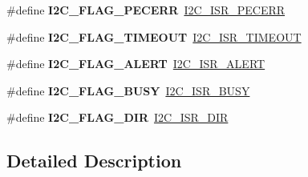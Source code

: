 \begin{DoxyCompactItemize}
\#define {\bfseries I2\+C\+\_\+\+F\+L\+A\+G\+\_\+\+P\+E\+C\+E\+RR}~\hyperlink{group___peripheral___registers___bits___definition_ga8b1d42968194fb42f9cc9bb2c2806281}{I2\+C\+\_\+\+I\+S\+R\+\_\+\+P\+E\+C\+E\+RR}
\item 
\mbox{\label{group___i2_c___flag__definition_ga89c8d5d8ccc77a8619fafe9b39d1cc74}} 
\#define {\bfseries I2\+C\+\_\+\+F\+L\+A\+G\+\_\+\+T\+I\+M\+E\+O\+UT}~\hyperlink{group___peripheral___registers___bits___definition_ga63fc8ce165c42d0d719c45e58a82f574}{I2\+C\+\_\+\+I\+S\+R\+\_\+\+T\+I\+M\+E\+O\+UT}
\item 
\mbox{\label{group___i2_c___flag__definition_gacb0a234f9a7039a764b7d90a10e91dac}} 
\#define {\bfseries I2\+C\+\_\+\+F\+L\+A\+G\+\_\+\+A\+L\+E\+RT}~\hyperlink{group___peripheral___registers___bits___definition_ga4c6c779bca999450c595fc797a1fdeec}{I2\+C\+\_\+\+I\+S\+R\+\_\+\+A\+L\+E\+RT}
\item 
\mbox{\label{group___i2_c___flag__definition_ga50f69f043d99600221076100823b6ff3}} 
\#define {\bfseries I2\+C\+\_\+\+F\+L\+A\+G\+\_\+\+B\+U\+SY}~\hyperlink{group___peripheral___registers___bits___definition_ga12ba21dc10ca08a2063a1c4672ffb886}{I2\+C\+\_\+\+I\+S\+R\+\_\+\+B\+U\+SY}
\item 
\mbox{\label{group___i2_c___flag__definition_ga1db236ae26f1d9bab1dcebc1e62d6bf3}} 
\#define {\bfseries I2\+C\+\_\+\+F\+L\+A\+G\+\_\+\+D\+IR}~\hyperlink{group___peripheral___registers___bits___definition_gaa4890d7deb94106f946b28a7309e22aa}{I2\+C\+\_\+\+I\+S\+R\+\_\+\+D\+IR}
\end{DoxyCompactItemize}


\subsection{Detailed Description}
